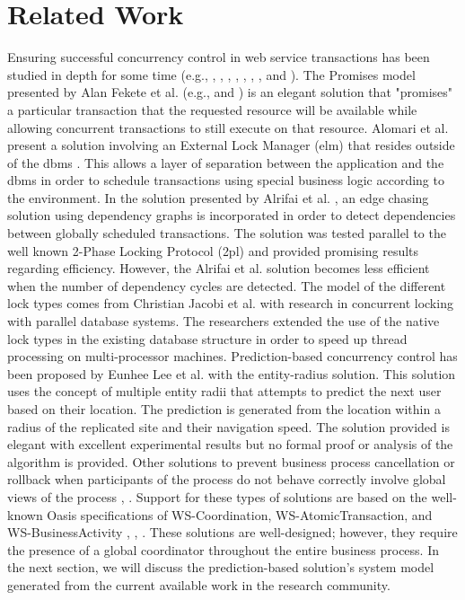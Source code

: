 \section{Related Work}
\label{pbs:related_work}

Ensuring successful concurrency control in web service transactions has been studied in depth for some time (e.g., \cite{Fekete_Promises}, \cite{Fekete_IsolationSupport}, \cite{Alrifai_Distributed_Managment}, \cite{dai_qos-driven_2009}, \cite{zhengdong_gao_combining_2005}, \cite{ferreira_transactional_2012}, \cite{kang-woo_lee_consistency_2000}, and \cite{olmsted_long_2015}). The Promises model presented by Alan Fekete et al. (e.g., \cite{Fekete_Promises} and \cite{Fekete_IsolationSupport}) is an elegant solution that "promises" a particular transaction that the requested resource will be available while allowing concurrent transactions to still execute on that resource. Alomari et al. present a solution involving an External Lock Manager (\gls{elm}) that resides outside of the \gls{dbms} \cite{Fekete_SnapshotIso}. This allows a layer of separation between the application and the \gls{dbms} in order to schedule transactions using special business logic according to the environment. In the solution presented by Alrifai et al. \cite{Alrifai_Distributed_Managment}, an edge chasing solution using dependency graphs is incorporated in order to detect dependencies between globally scheduled transactions. The solution was tested parallel to the well known 2-Phase Locking Protocol (\gls{2pl}) and provided promising results regarding efficiency. However, the Alrifai et al. solution becomes less efficient when the number of dependency cycles are detected. The model of the different lock types comes from Christian Jacobi et al. \cite{Jacobi_Locking} with research in concurrent locking with parallel database systems. The researchers extended the use of the native lock types in the existing database structure in order to speed up thread processing on multi-processor machines. Prediction-based concurrency control has been proposed by Eunhee Lee et al. \cite{Eunhee_PredictionBasedCC} with the entity-radius solution. This solution uses the concept of multiple entity radii that attempts to predict the next user based on their location. The prediction is generated from the location within a radius of the replicated site and their navigation speed. The solution provided is elegant with excellent experimental results but no formal proof or analysis of the algorithm is provided. Other solutions to prevent business process cancellation or rollback when participants of the process do not behave correctly involve global views of the process \cite{Fekete_RAMP}, \cite{Riegen_RuleBased}. Support for these types of solutions are based on the well-known Oasis specifications of WS-Coordination, WS-AtomicTransaction, and WS-BusinessActivity \cite{WSCO}, \cite{WSAT}, \cite{WSBA}. These solutions are well-designed; however, they require the presence of a global coordinator throughout the entire business process. In the next section, we will discuss the prediction-based solution's system model generated from the current available work in the research community.